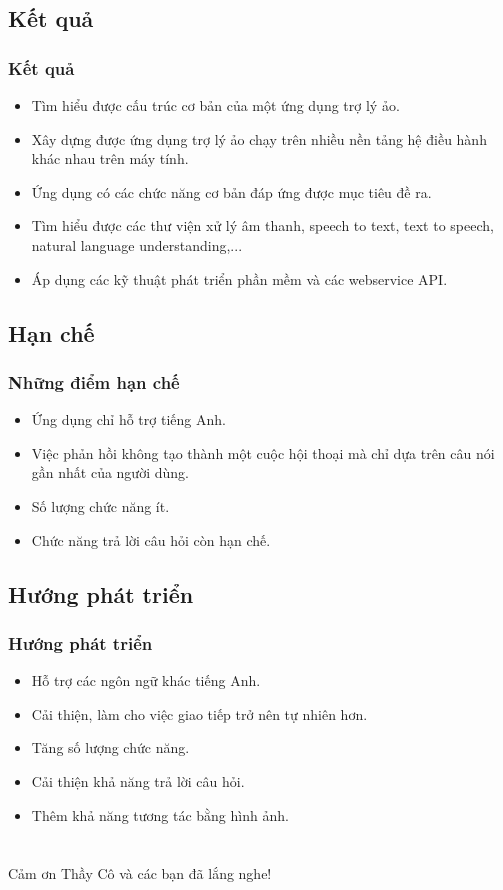 \documentclass{beamer}
\begin{document}
\subsection{Kết quả}
\begin{frame}
\frametitle{Kết quả}
\begin{itemize}
\item Tìm hiểu được cấu trúc cơ bản của một ứng dụng trợ lý ảo.
\item Xây dựng được ứng dụng trợ lý ảo chạy trên nhiều nền tảng hệ điều hành khác nhau trên máy tính.
\item Ứng dụng có các chức năng cơ bản đáp ứng được mục tiêu đề ra.
\item Tìm hiểu được các thư viện xử lý âm thanh, speech to text, text to speech, natural language understanding,...
\item Áp dụng các kỹ thuật phát triển phần mềm và các webservice API.
\end{itemize}
\end{frame}

\subsection{Hạn chế}
\begin{frame}
\frametitle{Những điểm hạn chế}
\begin{itemize}
\item Ứng dụng chỉ hỗ trợ tiếng Anh.
\item Việc phản hồi không tạo thành một cuộc hội thoại mà chỉ dựa trên câu nói gần nhất của người dùng.
\item Số lượng chức năng ít.
\item Chức năng trả lời câu hỏi còn hạn chế.
\end{itemize}
\end{frame}

\subsection{Hướng phát triển}
\begin{frame}
\frametitle{Hướng phát triển}
\begin{itemize}
\item Hỗ trợ các ngôn ngữ khác tiếng Anh.
\item Cải thiện, làm cho việc giao tiếp trở nên tự nhiên hơn.
\item Tăng số lượng chức năng.
\item Cải thiện khả năng trả lời câu hỏi.
\item Thêm khả năng tương tác bằng hình ảnh.
\end{itemize}
\end{frame}

\section*{}

\begin{frame}
\huge{\centerline{Cảm ơn Thầy Cô và các bạn đã lắng nghe!}}
\end{frame}
\end{document}
